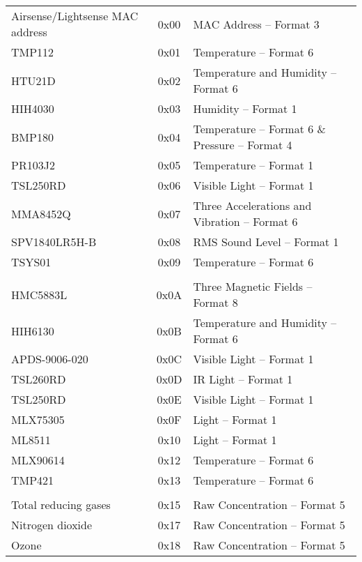 \begin{center}
\begin{longtable}{|l|c|l|}
     \hline \rowcolor{white} \multicolumn{3}{|c|}{{Airsense board}} \\ \hline
        Airsense/Lightsense MAC address & 0x00 & MAC Address -- Format 3 \\
        TMP112 & 0x01 & Temperature -- Format 6\\
        HTU21D & 0x02 & Temperature and Humidity -- Format 6\\
        HIH4030 & 0x03 & Humidity -- Format 1 \\
        BMP180 & 0x04 & Temperature -- Format 6 \& Pressure -- Format 4\\
        PR103J2 & 0x05 & Temperature -- Format 1\\
        TSL250RD & 0x06 & Visible Light -- Format 1\\
        MMA8452Q & 0x07 & Three Accelerations and Vibration -- Format 6\\
        SPV1840LR5H-B & 0x08 & RMS Sound Level -- Format 1\\
        TSYS01 & 0x09 & Temperature -- Format 6\\
     \hline \rowcolor{white} \multicolumn{3}{|c|}{{Lightsense board}} \\ \hline
        HMC5883L & 0x0A & Three Magnetic Fields -- Format 8\\
        HIH6130 & 0x0B & Temperature and Humidity -- Format 6\\
        APDS-9006-020 & 0x0C & Visible Light -- Format 1\\
        TSL260RD & 0x0D & IR Light -- Format 1\\
        TSL250RD & 0x0E & Visible Light -- Format 1\\
        MLX75305 & 0x0F & Light -- Format 1\\
        ML8511 & 0x10 & Light -- Format 1\\
        MLX90614 & 0x12 & Temperature -- Format 6\\
        TMP421 & 0x13 & Temperature -- Format 6\\
     \hline \rowcolor{white} \multicolumn{3}{|c|}{{Chemsense board}} \\ \hline
        Total reducing gases & 0x15 & Raw Concentration -- Format 5\\
        Nitrogen dioxide & 0x17 & Raw Concentration -- Format 5\\
        Ozone & 0x18 & Raw Concentration -- Format 5\\

\end{longtable}
\end{center}
